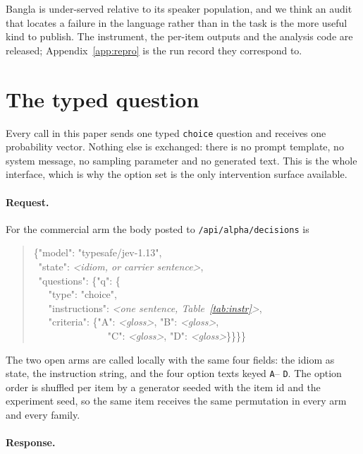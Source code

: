 \documentclass[11pt]{article}
\begin{document}
Bangla is under-served relative to its speaker population, and we think an audit
that locates a failure in the language rather than in the task is the more useful
kind to publish. The instrument, the per-item outputs and the analysis code are released; Appendix~\ref{app:repro} is the run record they correspond to.



\appendix

\section{The typed question}
\label{app:payload}

Every call in this paper sends one typed \texttt{choice} question and receives
one probability vector. Nothing else is exchanged: there is no prompt template,
no system message, no sampling parameter and no generated text. This is the
whole interface, which is why the option set is the only intervention surface
available.

\paragraph{Request.} For the commercial arm the body posted to
\texttt{/api/alpha/decisions} is

\begin{quote}\footnotesize\ttfamily
\{"model": "typesafe/jev-1.13",\\
\ "state": \textit{<idiom, or carrier sentence>},\\
\ "questions": \{"q": \{\\
\ \ \ "type": "choice",\\
\ \ \ "instructions": \textit{<one sentence, Table~\ref{tab:instr}>},\\
\ \ \ "criteria": \{"A": \textit{<gloss>}, "B": \textit{<gloss>},\\
\ \ \ \ \ \ \ \ \ \ \ \ \ \ \ "C": \textit{<gloss>}, "D": \textit{<gloss>}\}\}\}\}
\end{quote}

The two open arms are called locally with the same four fields: the idiom as
state, the instruction string, and the four option texts keyed \texttt{A}--%
\texttt{D}. The option order is shuffled per item by a generator seeded with the
item id and the experiment seed, so the same item receives the same permutation
in every arm and every family.

\paragraph{Response.}
\end{document}
